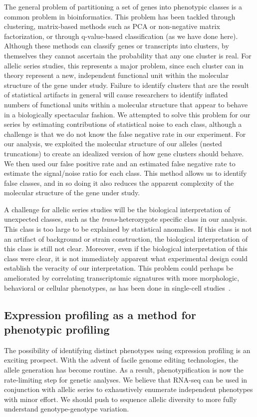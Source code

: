 \documentclass[10pt, twocolumn]{article}
\begin{document}
The general problem of partitioning a set of genes into phenotypic classes is a
common problem in bioinformatics. This problem has been tackled through
clustering, matrix-based methods such as PCA or non-negative
matrix factorization, or through q-value-based classification (as we have done
here). Although these methods can classify genes or transcripts into clusters,
by themselves they cannot ascertain the probability that any one cluster is real.
For allelic series studies, this represents a major problem, since each cluster
can in theory represent a new, independent functional unit within the molecular
structure of the gene under study. Failure to identify clusters that are the
result of statistical artifacts in general will cause researchers to identify
inflated numbers of functional units within a molecular structure that appear to
behave in a biologically spectacular fashion. We attempted to solve this problem
for our series by estimating contributions of statistical noise to each class,
although a challenge is that we do not know the false negative rate in our
experiment. For our analysis, we exploited the molecular structure of our
alleles (nested truncations) to create an idealized version of how gene clusters
should behave. We then used our false positive rate and an estimated false
negative rate to estimate the signal/noise ratio for each class. This method
allows us to identify false classes, and in so doing it also reduces the apparent
complexity of the molecular structure of the gene under study.

A challenge for allelic series studies will be the biological interpretation of
unexpected classes, such as the \emph{trans}-heterozygote specific class in our
analysis. This class is too large to be explained by statistical anomalies.
If this class is not an artifact of background or strain construction, the
biological interpretation of this class is still not clear. Moreover, even if
the biological interpretation of this class were clear, it is not immediately
apparent what experimental design could establish the veracity of our
interpretation. This problem could perhaps be ameliorated by correlating
transcriptomic signatures with more morphologic, behavioral or cellular
phenotypes, as has been done in single-cell studies~\cite{Lane2017}.

\subsection*{Expression profiling as a method for phenotypic profiling}
The possibility of identifying distinct phenotypes using expression profiling is
an exciting prospect. With the advent of facile genome editing technologies, the
allele generation has become routine. As a result, phenotypification is now the
rate-limiting step for genetic analyses. We believe that RNA-seq can be used in
conjunction with allelic series to exhaustively enumerate independent phenotypes
with minor effort. We should push to sequence allelic diversity to more fully
understand genotype-genotype variation.
\end{document}
